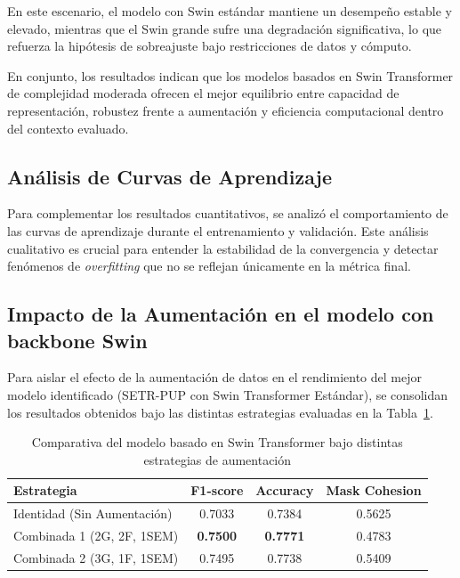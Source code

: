 \documentclass[onecolumn, 12pt , journal]{IEEEtran}
\begin{document}
En este escenario, el modelo con Swin estándar mantiene un desempeño estable y elevado, mientras que el Swin grande sufre una degradación significativa, lo que refuerza la hipótesis de sobreajuste bajo restricciones de datos y cómputo.

En conjunto, los resultados indican que los modelos basados en Swin Transformer de complejidad moderada ofrecen el mejor equilibrio entre capacidad de representación, robustez frente a aumentación y eficiencia computacional dentro del contexto evaluado.



\subsection{Análisis de Curvas de Aprendizaje}

Para complementar los resultados cuantitativos, se analizó el comportamiento de las curvas de aprendizaje durante el entrenamiento y validación. Este análisis cualitativo es crucial para entender la estabilidad de la convergencia y detectar fenómenos de \emph{overfitting} que no se reflejan únicamente en la métrica final.


\subsection{Impacto de la Aumentación en el modelo con backbone Swin}

Para aislar el efecto de la aumentación de datos en el rendimiento del mejor modelo identificado (SETR-PUP con Swin Transformer Estándar), se consolidan los resultados obtenidos bajo las distintas estrategias evaluadas en la Tabla~\ref{tab:swin_augmentation_comparison}.

\begin{table}[h]
\centering
\caption{Comparativa del modelo basado en Swin Transformer bajo distintas estrategias de aumentación}
\label{tab:swin_augmentation_comparison}
\begin{tabular}{lccc}
\hline
\textbf{Estrategia} & \textbf{F1-score} & \textbf{Accuracy} & \textbf{Mask Cohesion} \\ 
\hline
Identidad (Sin Aumentación) & 0.7033 & 0.7384 & 0.5625 \\
Combinada 1 (2G, 2F, 1SEM) & \textbf{0.7500} & \textbf{0.7771} & 0.4783 \\
Combinada 2 (3G, 1F, 1SEM) & 0.7495 & 0.7738 & 0.5409 \\
\hline
\end{tabular}
\end{table}
\end{document}
